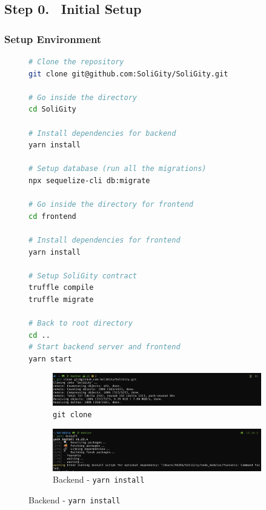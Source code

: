 \documentclass[12pt]{article}
\renewcommand{\_}{\kern-1.5pt\textunderscore\kern-1.5pt}
\begin{document}
\renewcommand\thesubsection{Step \arabic{subsection}.}
\renewcommand\thesubsubsection{\arabic{subsubsection}.}

\subsection*{Step 0. \(\;\;\)Initial Setup}

\subsubsection{Setup Environment}

\begin{figure}[H]
	\begin{minipage}[c]{0.4\linewidth}
		\begin{lstlisting}[language=bash]
# Clone the repository
git clone git@github.com:SoliGity/SoliGity.git

# Go inside the directory
cd SoliGity

# Install dependencies for backend
yarn install

# Setup database (run all the migrations)
npx sequelize-cli db:migrate

# Go inside the directory for frontend
cd frontend

# Install dependencies for frontend
yarn install

# Setup SoliGity contract
truffle compile
truffle migrate

# Back to root directory
cd ..
# Start backend server and frontend
yarn start
				\end{lstlisting}
	\end{minipage}\hfill
	\begin{minipage}[c]{0.5\linewidth}
		\centering
		\begin{subfigure}[b]{\textwidth}
			\centering
			\includegraphics[width=\textwidth]{graphs/01. git_clone}
			\caption{\texttt{git clone}}
		\end{subfigure}
			\begin{subfigure}[b]{\textwidth}
			\centering
			\includegraphics[width=\textwidth]{graphs/02. yarn_install_backend}
			\caption{Backend - \texttt{yarn install}}


\end{subfigure}
\end{minipage}
\end{figure}
\end{document}
